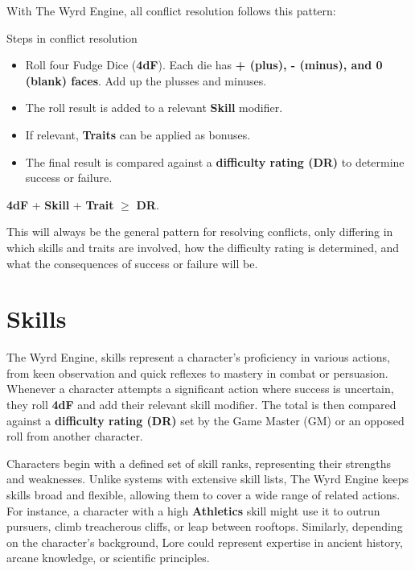 With The Wyrd Engine, all conflict resolution follows this pattern:

\begin{DndReadAloud}{Steps in conflict resolution}
	\begin{itemize}
		\item Roll four Fudge Dice (\textbf{4dF}).
		      Each die has \textbf{+ (plus), - (minus), and 0 (blank) faces}. Add up the plusses and minuses.
		\item The roll result is added to a relevant \textbf{Skill} modifier.
		\item If relevant, \textbf{Traits} can be applied as bonuses.
		\item The final result is compared against a \textbf{difficulty rating (DR)} to determine success or failure.
	\end{itemize}
	\begin{center}
		\textbf{4dF} + \textbf{Skill} + \textbf{Trait} $\geq$ \textbf{DR}.	
	\end{center}
\end{DndReadAloud}

This will always be the general pattern for resolving conflicts, only differing in which skills and traits are involved, how the difficulty rating is determined, and what the consequences of success or failure will be.

\section{Skills}

 The Wyrd Engine, skills represent a character’s proficiency in various actions, from keen observation and quick reflexes to mastery in combat or persuasion. Whenever a character attempts a significant action where success is uncertain, they roll \textbf{4dF} and add their relevant skill modifier. The total is then compared against a \textbf{difficulty rating (DR)} set by the Game Master (GM) or an opposed roll from another character.

Characters begin with a defined set of skill ranks, representing their strengths and weaknesses. Unlike systems with extensive skill lists, The Wyrd Engine keeps skills broad and flexible, allowing them to cover a wide range of related actions. For instance, a character with a high \textbf{Athletics} skill might use it to outrun pursuers, climb treacherous cliffs, or leap between rooftops. Similarly, depending on the character's background, Lore could represent expertise in ancient history, arcane knowledge, or scientific principles.

